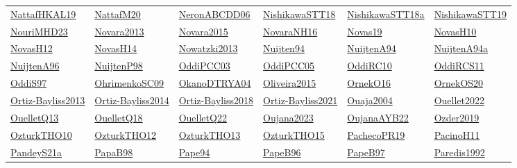\begin{longtable}{*{6}{l}}
\hyperref[detail:NattafHKAL19]{NattafHKAL19} & \hyperref[detail:NattafM20]{NattafM20} & \hyperref[detail:NeronABCDD06]{NeronABCDD06} & \hyperref[detail:NishikawaSTT18]{NishikawaSTT18} & \hyperref[detail:NishikawaSTT18a]{NishikawaSTT18a} & \hyperref[detail:NishikawaSTT19]{NishikawaSTT19}\\ 
\hyperref[detail:NouriMHD23]{NouriMHD23} & \hyperref[detail:Novara2013]{Novara2013} & \hyperref[detail:Novara2015]{Novara2015} & \hyperref[detail:NovaraNH16]{NovaraNH16} & \hyperref[detail:Novas19]{Novas19} & \hyperref[detail:NovasH10]{NovasH10}\\ 
\hyperref[detail:NovasH12]{NovasH12} & \hyperref[detail:NovasH14]{NovasH14} & \hyperref[detail:Nowatzki2013]{Nowatzki2013} & \hyperref[detail:Nuijten94]{Nuijten94} & \hyperref[detail:NuijtenA94]{NuijtenA94} & \hyperref[detail:NuijtenA94a]{NuijtenA94a}\\ 
\hyperref[detail:NuijtenA96]{NuijtenA96} & \hyperref[detail:NuijtenP98]{NuijtenP98} & \hyperref[detail:OddiPCC03]{OddiPCC03} & \hyperref[detail:OddiPCC05]{OddiPCC05} & \hyperref[detail:OddiRC10]{OddiRC10} & \hyperref[detail:OddiRCS11]{OddiRCS11}\\ 
\hyperref[detail:OddiS97]{OddiS97} & \hyperref[detail:OhrimenkoSC09]{OhrimenkoSC09} & \hyperref[detail:OkanoDTRYA04]{OkanoDTRYA04} & \hyperref[detail:Oliveira2015]{Oliveira2015} & \hyperref[detail:OrnekO16]{OrnekO16} & \hyperref[detail:OrnekOS20]{OrnekOS20}\\ 
\hyperref[detail:Ortiz-Bayliss2013]{Ortiz-Bayliss2013} & \hyperref[detail:Ortiz-Bayliss2014]{Ortiz-Bayliss2014} & \hyperref[detail:Ortiz-Bayliss2018]{Ortiz-Bayliss2018} & \hyperref[detail:Ortiz-Bayliss2021]{Ortiz-Bayliss2021} & \hyperref[detail:Ouaja2004]{Ouaja2004} & \hyperref[detail:Ouellet2022]{Ouellet2022}\\ 
\hyperref[detail:OuelletQ13]{OuelletQ13} & \hyperref[detail:OuelletQ18]{OuelletQ18} & \hyperref[detail:OuelletQ22]{OuelletQ22} & \hyperref[detail:Oujana2023]{Oujana2023} & \hyperref[detail:OujanaAYB22]{OujanaAYB22} & \hyperref[detail:Ozder2019]{Ozder2019}\\ 
\hyperref[detail:OzturkTHO10]{OzturkTHO10} & \hyperref[detail:OzturkTHO12]{OzturkTHO12} & \hyperref[detail:OzturkTHO13]{OzturkTHO13} & \hyperref[detail:OzturkTHO15]{OzturkTHO15} & \hyperref[detail:PachecoPR19]{PachecoPR19} & \hyperref[detail:PacinoH11]{PacinoH11}\\ 
\hyperref[detail:PandeyS21a]{PandeyS21a} & \hyperref[detail:PapaB98]{PapaB98} & \hyperref[detail:Pape94]{Pape94} & \hyperref[detail:PapeB96]{PapeB96} & \hyperref[detail:PapeB97]{PapeB97} & \hyperref[detail:Paredis1992]{Paredis1992}\\ 

\end{longtable}
